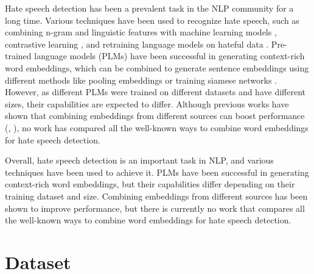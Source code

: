 \documentclass{article} %
\begin{document}


Hate speech detection has been a prevalent task in the NLP community for a long time. Various techniques have been used to recognize hate speech, such as combining n-gram and linguistic features with machine learning models \cite{davidson2017automated}, contrastive learning \cite{kim-etal-2022-generalizable}, and retraining language models on hateful data \cite{caselli2020hatebert}. Pre-trained language models (PLMs) have been successful in generating context-rich word embeddings, which can be combined to generate sentence embeddings using different methods like pooling embeddings or training siamese networks \cite{reimers-gurevych-2019-sentence}. However, as different PLMs were trained on different datasets and have different sizes, their capabilities are expected to differ. Although previous works have shown that combining embeddings from different sources can boost performance (\cite{lester2020multiple},  \cite{BADRI2022769}), no work has compared all the well-known ways to combine word embeddings for hate speech detection.

Overall, hate speech detection is an important task in NLP, and various techniques have been used to achieve it. PLMs have been successful in generating context-rich word embeddings, but their capabilities differ depending on their training dataset and size. Combining embeddings from different sources has been shown to improve performance, but there is currently no work that compares all the well-known ways to combine word embeddings for hate speech detection.

\section{Dataset}
\end{document}
